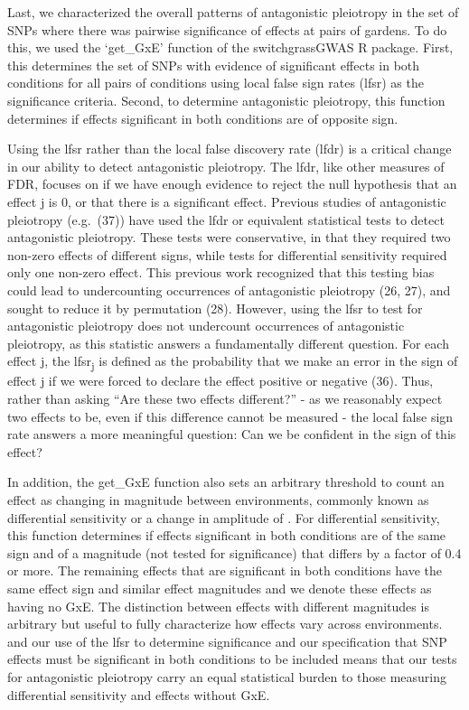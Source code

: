 \documentclass[
  9pt,
  twocolumn,
  twoside]{pnas-new}
\begin{document}
Last, we characterized the overall patterns of antagonistic pleiotropy
in the set of SNPs where there was pairwise significance of effects at
pairs of gardens. To do this, we used the `get\_GxE' function of the
switchgrassGWAS R package. First, this determines the set of SNPs with
evidence of significant effects in both conditions for all pairs of
conditions using local false sign rates (lfsr) as the significance
criteria. Second, to determine antagonistic pleiotropy, this function
determines if effects significant in both conditions are of opposite
sign.

Using the lfsr rather than the local false discovery rate (lfdr) is a
critical change in our ability to detect antagonistic pleiotropy. The
lfdr, like other measures of FDR, focuses on if we have enough evidence
to reject the null hypothesis that an effect j is 0, or that there is a
significant effect. Previous studies of antagonistic pleiotropy
(e.g.~(37)) have used the lfdr or equivalent statistical tests to detect
antagonistic pleiotropy. These tests were conservative, in that they
required two non-zero effects of different signs, while tests for
differential sensitivity required only one non-zero effect. This
previous work recognized that this testing bias could lead to
undercounting occurrences of antagonistic pleiotropy (26, 27), and
sought to reduce it by permutation (28). However, using the lfsr to test
for antagonistic pleiotropy does not undercount occurrences of
antagonistic pleiotropy, as this statistic answers a fundamentally
different question. For each effect j, the lfsr\textsubscript{j} is
defined as the probability that we make an error in the sign of effect j
if we were forced to declare the effect positive or negative (36). Thus,
rather than asking ``Are these two effects different?'' - as we
reasonably expect two effects to be, even if this difference cannot be
measured - the local false sign rate answers a more meaningful question:
Can we be confident in the sign of this effect?

In addition, the get\_GxE function also sets an arbitrary threshold to
count an effect as changing in magnitude between environments, commonly
known as differential sensitivity or a change in amplitude of . For
differential sensitivity, this function determines if effects
significant in both conditions are of the same sign and of a magnitude
(not tested for significance) that differs by a factor of 0.4 or more.
The remaining effects that are significant in both conditions have the
same effect sign and similar effect magnitudes and we denote these
effects as having no GxE. The distinction between effects with different
magnitudes is arbitrary but useful to fully characterize how effects
vary across environments. and our use of the lfsr to determine
significance and our specification that SNP effects must be significant
in both conditions to be included means that our tests for antagonistic
pleiotropy carry an equal statistical burden to those measuring
differential sensitivity and effects without GxE.
\end{document}
